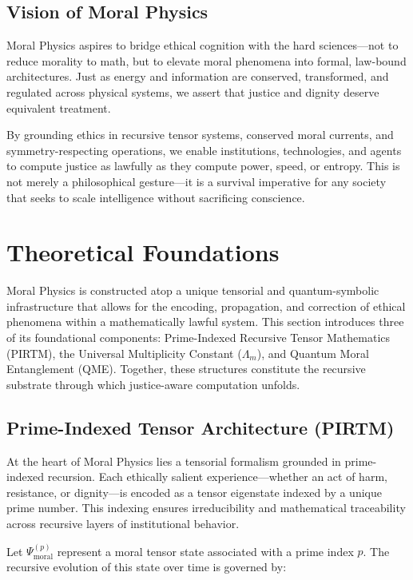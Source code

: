 \documentclass{article}
\theoremstyle{plain}
\theoremstyle{claimstyle}
\begin{document}
\subsection{Vision of Moral Physics}

Moral Physics aspires to bridge ethical cognition with the hard sciences—not to reduce morality to math, but to elevate moral phenomena into formal, law-bound architectures. Just as energy and information are conserved, transformed, and regulated across physical systems, we assert that justice and dignity deserve equivalent treatment.

By grounding ethics in recursive tensor systems, conserved moral currents, and symmetry-respecting operations, we enable institutions, technologies, and agents to compute justice as lawfully as they compute power, speed, or entropy. This is not merely a philosophical gesture—it is a survival imperative for any society that seeks to scale intelligence without sacrificing conscience.

\section{Theoretical Foundations}

Moral Physics is constructed atop a unique tensorial and quantum-symbolic infrastructure that allows for the encoding, propagation, and correction of ethical phenomena within a mathematically lawful system. This section introduces three of its foundational components: Prime-Indexed Recursive Tensor Mathematics (PIRTM), the Universal Multiplicity Constant (\(\Lambda_m\)), and Quantum Moral Entanglement (QME). Together, these structures constitute the recursive substrate through which justice-aware computation unfolds.

\subsection{Prime-Indexed Tensor Architecture (PIRTM)}

At the heart of Moral Physics lies a tensorial formalism grounded in prime-indexed recursion. Each ethically salient experience—whether an act of harm, resistance, or dignity—is encoded as a tensor eigenstate indexed by a unique prime number. This indexing ensures irreducibility and mathematical traceability across recursive layers of institutional behavior.

Let \(\Psi_{\text{moral}}^{(p)}\) represent a moral tensor state associated with a prime index \(p\). The recursive evolution of this state over time is governed by:
\end{document}
